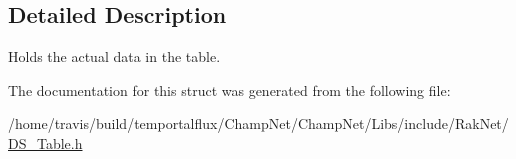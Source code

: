 \subsection{Detailed Description}
Holds the actual data in the table. 

The documentation for this struct was generated from the following file\-:\begin{DoxyCompactItemize}
\item 
/home/travis/build/temportalflux/\-Champ\-Net/\-Champ\-Net/\-Libs/include/\-Rak\-Net/\hyperlink{_d_s___table_8h}{D\-S\-\_\-\-Table.\-h}\end{DoxyCompactItemize}
